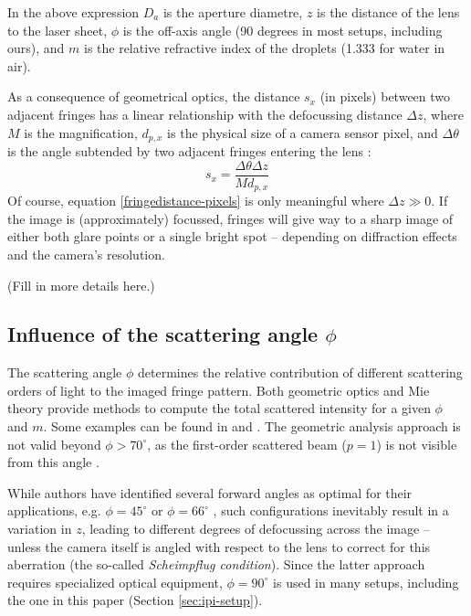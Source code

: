 \documentclass[10pt]{book}
\begin{document}
In the above expression $D_a$ is the aperture diametre, $z$ is the distance of
the lens to the laser sheet, $\phi$ is the off-axis angle (90 degrees in most
setups, including ours), and $m$ is the relative refractive index of the
droplets (1.333 for water in air).

As a consequence of geometrical optics, the distance $s_x$ (in pixels) between two
adjacent fringes has a linear relationship with the defocussing distance $\Delta
z$, where $M$ is the magnification, $d_{p,x}$ is the physical size of a
camera sensor pixel, and $\Delta \theta$ is the angle subtended by two adjacent
fringes entering the lens \cite{Pan06}:
\begin{equation}
  s_x = \frac{\Delta \theta \Delta z}{M d_{p,x}} 
  \label{fringedistance-pixels}
\end{equation}
Of course, equation \eqref{fringedistance-pixels} is only meaningful where $\Delta z \gg
0$. If the image is (approximately) focussed, fringes will give way to a sharp
image of either both glare points or a single bright spot -- depending on
diffraction effects and the camera's resolution.

(Fill in more details here.)
\subsection{Influence of the scattering angle $\phi$}
The scattering angle $\phi$ determines the relative contribution of 
different scattering orders of light to the imaged fringe pattern. Both
geometric optics \cite{Vandehulst12} and Mie theory provide methods to compute
the total scattered intensity for a given $\phi$ and $m$. Some examples can be
found in \citet{Kawaguchi02} and \citet{Mounaim99}. The geometric analysis
approach is not valid beyond $\phi > 70^\circ$, as the first-order
scattered beam ($p=1$) is not visible from this angle \cite{Glover95}.

While authors have identified several forward angles as optimal for their
applications, e.g. $\phi = 45^\circ$ \cite{Glover95} or $\phi = 66^\circ$
\cite{Mounaim99}, such configurations inevitably result in a variation in $z$,
leading to different degrees of defocussing across the image -- unless the
camera itself is angled with respect to the lens to correct for this
aberration (the so-called \emph{Scheimpflug condition}). Since the latter
approach requires specialized optical equipment, $\phi = 90^\circ$ is used in
many setups, including the one in this paper (Section \ref{sec:ipi-setup}).
\end{document}
